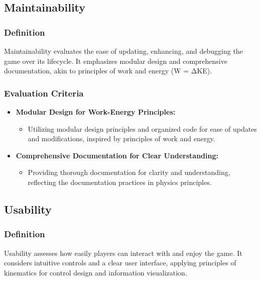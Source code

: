 \documentclass[12pt, titlepage]{article}
\begin{document}
\subsection{Maintainability}
\subsubsection{Definition}
Maintainability evaluates the ease of updating, enhancing, and debugging the game over its lifecycle. It emphasizes modular design and comprehensive documentation, akin to principles of work and energy (W = ΔKE).
\subsubsection{Evaluation Criteria}

\begin{itemize}
    \item \textbf{Modular Design for Work-Energy Principles:}
       \begin{itemize}
  \item Utilizing modular design principles and organized code for ease of updates and modifications, inspired by principles of work and energy.
        \end{itemize}

    \item \textbf{Comprehensive Documentation for Clear Understanding:}
        \begin{itemize}
            \item Providing thorough documentation for clarity and understanding, reflecting the documentation practices in physics principles.
        \end{itemize}
\end{itemize}

\subsection{Usability}
\subsubsection{Definition}
	Usability assesses how easily players can interact with and enjoy the game. It considers intuitive controls and a clear user interface, applying principles of kinematics for control design and information visualization.
\end{document}
